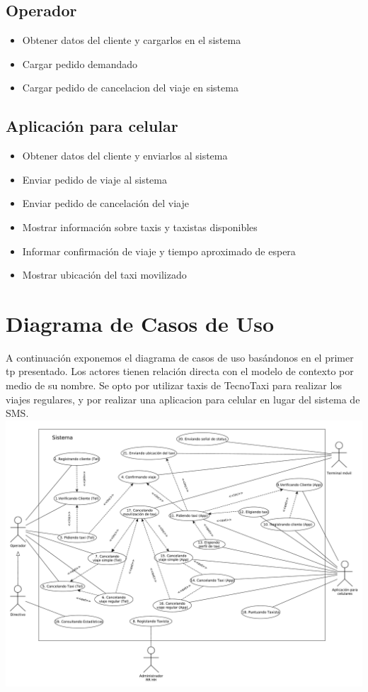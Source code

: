 \documentclass[a4paper]{article}
\begin{document}
\subsection{Operador}

\begin{itemize}
\item Obtener datos del cliente y cargarlos en el sistema
\item Cargar pedido demandado
\item Cargar pedido de cancelacion del viaje en sistema
\end{itemize}

\subsection{Aplicaci\'on para celular}
\begin{itemize}
\item Obtener datos del cliente y enviarlos al sistema
\item Enviar pedido de viaje al sistema
\item Enviar pedido de cancelaci\'on del viaje
\item Mostrar informaci\'on sobre taxis y taxistas disponibles
\item Informar confirmaci\'on de viaje y tiempo aproximado de espera
\item Mostrar ubicaci\'on del taxi movilizado 
\end{itemize}

\section{Diagrama de Casos de Uso}

A continuaci\'on exponemos el diagrama de casos de uso bas\'andonos en el primer tp presentado. 
Los actores tienen relaci\'on directa con el modelo de contexto por medio de su nombre.
Se opto por utilizar taxis de TecnoTaxi para realizar los viajes regulares, y por realizar una aplicacion para celular en lugar del sistema
de SMS.
\\
\includegraphics[scale=0.38]{diag_CasosDeUso.pdf}
\end{document}
